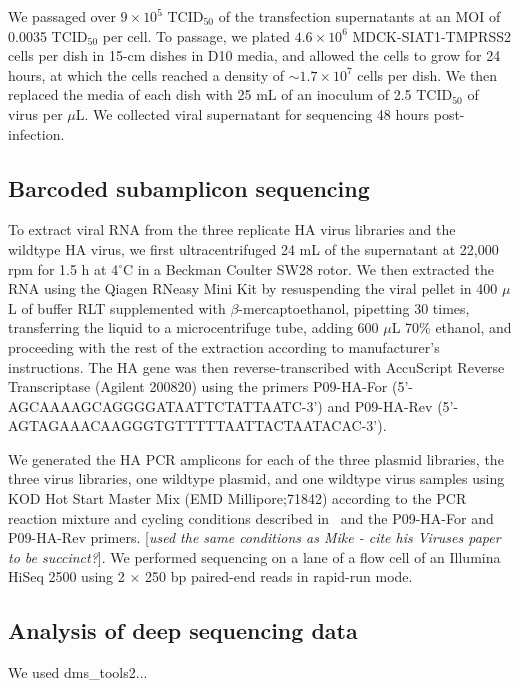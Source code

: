 \documentclass[9pt,twocolumn,twoside]{pnas-new}
\newcommand{\comment}[1]{{\color{red}[\textsl{#1}]}}
\begin{document}
{We passaged over $9 \times 10^5$ TCID$_{50}$ of the transfection supernatants at an MOI of 0.0035 TCID$_{50}$ per cell.
To passage, we plated $4.6 \times 10^6$ MDCK-SIAT1-TMPRSS2 cells per dish in 15-cm dishes in D10 media, and allowed the cells to grow for 24 hours, at which the cells reached a density of $\sim 1.7 \times 10^7$ cells per dish.
We then replaced the media of each dish with 25 mL of an inoculum of 2.5 TCID$_{50}$ of virus per $\mu$L.
We collected viral supernatant for sequencing 48 hours post-infection.

\subsection*{Barcoded subamplicon sequencing}
To extract viral RNA from the three replicate HA virus libraries and the wildtype HA virus, we first ultracentrifuged 24 mL of the supernatant at 22,000 rpm for 1.5 h at 4$^{\circ}$C in a Beckman Coulter SW28 rotor.
We then extracted the RNA using the Qiagen RNeasy Mini Kit by resuspending the viral pellet in 400 $\mu$L of buffer RLT supplemented with $\beta$-mercaptoethanol, pipetting 30 times, transferring the liquid to a microcentrifuge tube, adding 600 $\mu$L 70\% ethanol, and proceeding with the rest of the extraction according to manufacturer's instructions.
The HA gene was then reverse-transcribed with AccuScript Reverse Transcriptase (Agilent 200820) using the primers P09-HA-For (5'-AGCAAAAGCAGGGGATAATTCTATTAATC-3') and P09-HA-Rev (5'-AGTAGAAACAAGGGTGTTTTTAATTACTAATACAC-3').

We generated the HA PCR amplicons for each of the three plasmid libraries, the three virus libraries, one wildtype plasmid, and one wildtype virus samples using KOD Hot Start Master Mix (EMD Millipore;71842) according to the PCR reaction mixture and cycling conditions described in~\cite{bloom2014experimentally} and the P09-HA-For and P09-HA-Rev primers.
\comment{used the same conditions as Mike - cite his Viruses paper to be succinct?}.
We performed sequencing on a lane of a flow cell of an Illumina HiSeq 2500 using 2 $\times$ 250 bp paired-end reads in rapid-run mode.

\subsection*{Analysis of deep sequencing data}
We used dms\_tools2...

}
\end{document}
